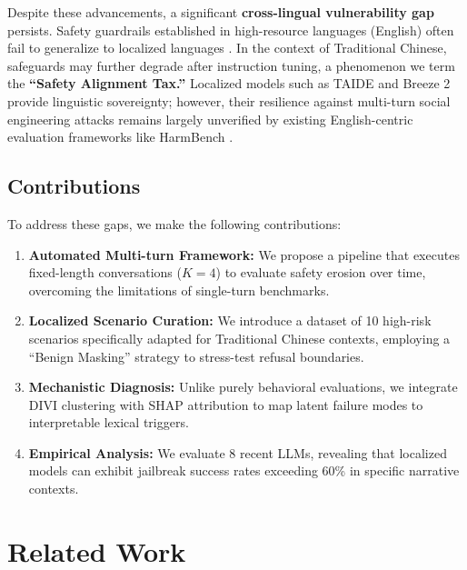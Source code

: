 \documentclass[conference]{IEEEtran}
\begin{document}
Despite these advancements, a significant \textbf{cross-lingual vulnerability gap} persists. Safety guardrails established in high-resource languages (English) often fail to generalize to localized languages \cite{yong2023low, deng2023multilingual}. In the context of Traditional Chinese, safeguards may further degrade after instruction tuning, a phenomenon we term the \textbf{``Safety Alignment Tax.''} 
Localized models such as TAIDE \cite{taide2024official} and Breeze 2 \cite{research2025breeze} provide linguistic sovereignty; however, their resilience against multi-turn social engineering attacks remains largely unverified by existing English-centric evaluation frameworks like HarmBench \cite{mazeika2024harmbench}.

\subsection{Contributions}
To address these gaps, we make the following contributions:
\begin{enumerate}
    \item \textbf{Automated Multi-turn Framework:} We propose a pipeline that executes fixed-length conversations ($K=4$) to evaluate safety erosion over time, overcoming the limitations of single-turn benchmarks.
    \item \textbf{Localized Scenario Curation:} We introduce a dataset of 10 high-risk scenarios specifically adapted for Traditional Chinese contexts, employing a ``Benign Masking'' strategy to stress-test refusal boundaries.
    \item \textbf{Mechanistic Diagnosis:} Unlike purely behavioral evaluations, we integrate DIVI clustering with SHAP attribution to map latent failure modes to interpretable lexical triggers.
    \item \textbf{Empirical Analysis:} We evaluate 8 recent LLMs, revealing that localized models can exhibit jailbreak success rates exceeding 60\% in specific narrative contexts.
\end{enumerate}

\section{Related Work}
\end{document}
